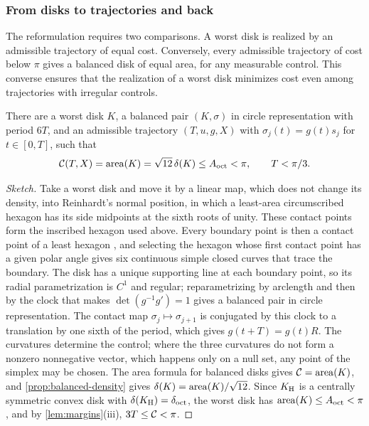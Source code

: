\subsubsection{From disks to trajectories and back}\label{sec:set-equivalence}

The reformulation requires two comparisons. A worst disk is realized by an admissible trajectory
of equal cost. Conversely, every admissible trajectory of cost below $\pi$ gives a balanced disk
of equal area, for any measurable control. This converse ensures that the realization of a worst
disk minimizes cost even among trajectories with irregular controls.

\begin{proposition}\label{prop:realization}
There are a worst disk $K$, a balanced pair $(K,\sigma)$ in circle representation with period
$6T$, and an admissible trajectory $(T,u,g,X)$ with $\sigma_j(t)=g(t)s_j$ for $t\in[0,T]$, such
that
\[
  \mathcal{C}(T,X)=\operatorname{area}(K)=\sqrt{12}\,\delta(K)\le A_{\mathrm{oct}}<\pi,\qquad T<\pi/3 .
\]
\end{proposition}

\begin{proof}[Sketch]
Take a worst disk and move it by a linear map, which does not change its density, into Reinhardt's
normal position, in which a least-area circumscribed hexagon has its side midpoints at the sixth
roots of unity. These contact points form the inscribed hexagon used above.
Every boundary point is then a contact point of a least hexagon \cite[\S2.2]{HalesVajjha2024},
and selecting the hexagon whose first contact point has a given polar angle gives six continuous
simple closed curves that trace the boundary. The disk has a unique supporting line at each
boundary point, so its radial parametrization is $C^1$ and regular; reparametrizing by arclength and
then by the clock that makes $\det(g^{-1}g')=1$ gives a balanced pair in circle representation. The
contact map $\sigma_j\mapsto\sigma_{j+1}$ is conjugated by this clock to a translation by one sixth
of the period, which gives $g(t+T)=g(t)R$. The curvatures determine the control; where the
three curvatures do not form a nonzero nonnegative vector, which happens only on a null set, any
point of the simplex may be chosen. The area formula for balanced disks gives $\mathcal{C}=\operatorname{area}(K)$, and
\cref{prop:balanced-density} gives $\delta(K)=\operatorname{area}(K)/\sqrt{12}$. Since $K_{\mathrm{H}}$ is a centrally
symmetric convex disk with $\delta(K_{\mathrm{H}})=\delta_{\mathrm{oct}}$, the worst disk has $\operatorname{area}(K)\le A_{\mathrm{oct}}<\pi$, and by
\cref{lem:margins}(iii), $3T\le\mathcal{C}<\pi$.
\end{proof}

